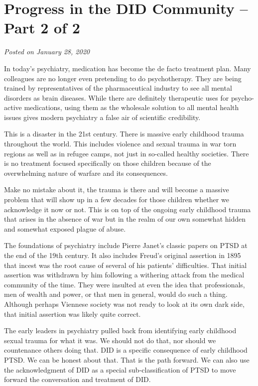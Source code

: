 \documentclass[]{book}
\begin{document}
\hypertarget{progress-in-the-did-community-part-2-of-2}{%
\section{Progress in the DID Community -- Part 2 of 2}\label{progress-in-the-did-community-part-2-of-2}}

\emph{Posted on January 28, 2020}

In today's psychiatry, medication has become the de facto treatment plan. Many colleagues are no longer even pretending to do psychotherapy. They are being trained by representatives of the pharmaceutical industry to see all mental disorders as brain diseases. While there are definitely therapeutic uses for psycho-active medications, using them as the wholesale solution to all mental health issues gives modern psychiatry a false air of scientific credibility.

This is a disaster in the 21st century. There is massive early childhood trauma throughout the world. This includes violence and sexual trauma in war torn regions as well as in refugee camps, not just in so-called healthy societies. There is no treatment focused specifically on those children because of the overwhelming nature of warfare and its consequences.

Make no mistake about it, the trauma is there and will become a massive problem that will show up in a few decades for those children whether we acknowledge it now or not. This is on top of the ongoing early childhood trauma that arises in the absence of war but in the realm of our own somewhat hidden and somewhat exposed plague of abuse.

The foundations of psychiatry include Pierre Janet's classic papers on PTSD at the end of the 19th century. It also includes Freud's original assertion in 1895 that incest was the root cause of several of his patients' difficulties. That initial assertion was withdrawn by him following a withering attack from the medical community of the time. They were insulted at even the idea that professionals, men of wealth and power, or that men in general, would do such a thing. Although perhaps Viennese society was not ready to look at its own dark side, that initial assertion was likely quite correct.

The early leaders in psychiatry pulled back from identifying early childhood sexual trauma for what it was. We should not do that, nor should we countenance others doing that. DID is a specific consequence of early childhood PTSD. We can be honest about that. That is the path forward. We can also use the acknowledgment of DID as a special sub-classification of PTSD to move forward the conversation and treatment of DID.
\end{document}
